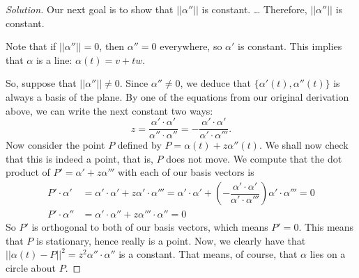 \documentclass[Shifrin_Solutions_Spring_2018]{subfiles}
\begin{document}
\begin{proof}[Solution]
Our next goal is to show that $||\alpha''||$ is constant.
\dots {}
Therefore, $||\alpha''||$ is constant.

Note that if $||\alpha''|| = 0$, then $\alpha''=0$ everywhere, so $\alpha'$ is constant. 
This implies that $\alpha$ is a line: $\alpha(t) = v+ t w$.

So, suppose that $||\alpha''||\neq 0$. Since $\alpha'' \neq 0$, we deduce that 
$\{ \alpha'(t), \alpha''(t) \}$ is always a basis of the plane.
By one of the equations from our original derivation above, we can write the next constant 
two ways:
\[
z = \dfrac{\alpha'\cdot \alpha'}{\alpha''\cdot\alpha''} = - \dfrac{\alpha'\cdot \alpha'}
{\alpha' \cdot \alpha'''} .
\]
Now consider the point $P$ defined by $ P = \alpha(t) + z \alpha''(t)$. We shall now check 
that this is indeed a point, that is, $P$ does not move.
We compute that the dot product of $P'= \alpha' + z \alpha'''$ with each of our basis vectors is
\begin{align*}
P' \cdot \alpha'& = \alpha' \cdot \alpha' + z \alpha' \cdot \alpha''' = \alpha' \cdot \alpha' 
+ \left( - \dfrac{\alpha'\cdot \alpha'}{\alpha' \cdot \alpha'''} \right) 
\alpha' \cdot \alpha''' = 0 \\
P' \cdot \alpha'' &  = \alpha' \cdot \alpha'' + z \alpha'''\cdot \alpha'' = 0
\end{align*}
So $P'$ is orthogonal to both of our basis vectors, which means $P'=0$.
This means that $P$ is stationary, hence really is a point. Now, we clearly have that 
$||\alpha(t) - P ||^2 = z^2 \alpha'' \cdot \alpha'' $ is a constant. That means, of course, 
that $\alpha$ lies on a circle about $P$.
\end{proof}


\vfill
\end{document}
